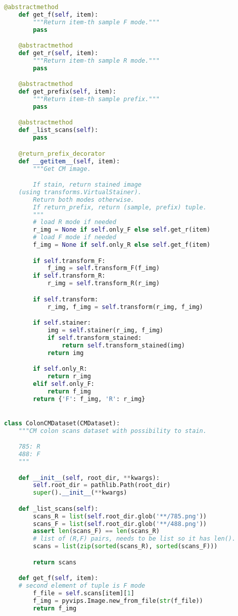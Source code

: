\documentclass[../main.tex]{subfiles}
\begin{document}
\begin{lstlisting}[language=Python]
    @abstractmethod
    def get_f(self, item):
        """Return item-th sample F mode."""
        pass

    @abstractmethod
    def get_r(self, item):
        """Return item-th sample R mode."""
        pass

    @abstractmethod
    def get_prefix(self, item):
        """Return item-th sample prefix."""
        pass

    @abstractmethod
    def _list_scans(self):
        pass

    @return_prefix_decorator
    def __getitem__(self, item):
        """Get CM image.

        If stain, return stained image
	(using transforms.VirtualStainer).
        Return both modes otherwise.
        If return_prefix, return (sample, prefix) tuple.
        """
        # load R mode if needed
        r_img = None if self.only_F else self.get_r(item)
        # load F mode if needed
        f_img = None if self.only_R else self.get_f(item)

        if self.transform_F:
            f_img = self.transform_F(f_img)
        if self.transform_R:
            r_img = self.transform_R(r_img)

        if self.transform:
            r_img, f_img = self.transform(r_img, f_img)

        if self.stainer:
            img = self.stainer(r_img, f_img)
            if self.transform_stained:
                return self.transform_stained(img)
            return img

        if self.only_R:
            return r_img
        elif self.only_F:
            return f_img
        return {'F': f_img, 'R': r_img}


class ColonCMDataset(CMDataset):
    """CM colon scans dataset with possibility to stain.

    785: R
    488: F
    """

    def __init__(self, root_dir, **kwargs):
        self.root_dir = pathlib.Path(root_dir)
        super().__init__(**kwargs)

    def _list_scans(self):
        scans_R = list(self.root_dir.glob('**/785.png'))
        scans_F = list(self.root_dir.glob('**/488.png'))
        assert len(scans_F) == len(scans_R)
        # list of (R,F) pairs, needs to be list so it has len().
        scans = list(zip(sorted(scans_R), sorted(scans_F)))

        return scans

    def get_f(self, item):
	# second element of tuple is F mode
        f_file = self.scans[item][1]
        f_img = pyvips.Image.new_from_file(str(f_file))
        return f_img


\end{lstlisting}
\end{document}
